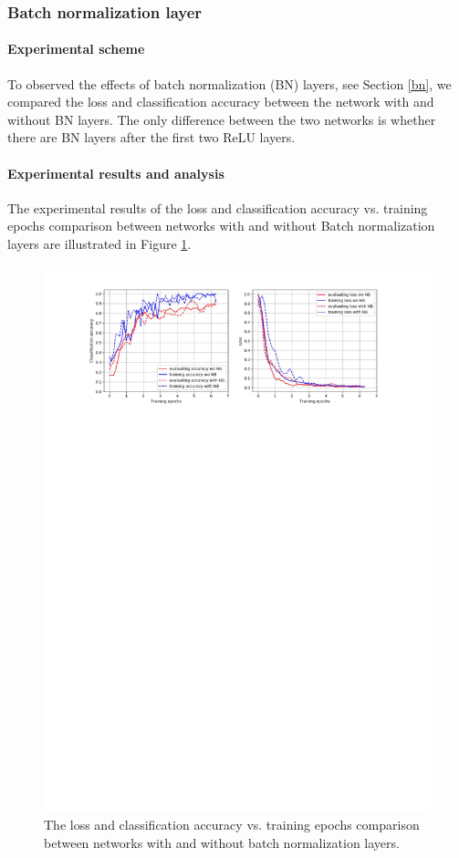 \subsubsection{Batch normalization layer}
\paragraph{Experimental scheme}
To observed the effects of batch normalization (BN) layers, see Section \ref{bn}, we compared the loss and classification accuracy between the network with and without BN layers. The only difference between the two networks is whether there are BN layers after the first two ReLU layers.  

\paragraph{Experimental results and analysis}
The experimental results of the loss and classification accuracy vs. training epochs comparison between networks with and without Batch normalization layers are illustrated in Figure \ref{fig:plot_bn_en}.
 \begin{figure}
	\includegraphics[trim=2.5cm 22.5cm 0cm 1cm]{fig01/plot_bn_en.pdf}
	\caption{The loss and classification accuracy vs. training epochs comparison between networks with and without batch normalization layers.}
	\label{fig:plot_bn_en}
\end{figure}

